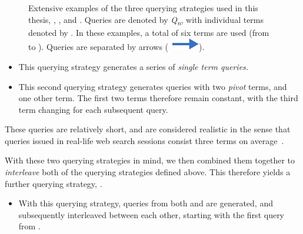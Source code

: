 \begin{figure}[t!]
    \centering
    \caption[Querying strategies ,  and ]{Extensive examples of the three querying strategies used in this thesis, , , and . Queries are denoted by \emph{Q\textsubscript{n}}, with individual terms denoted by . In these examples, a total of six terms are used (from  to ). Queries are separated by arrows (~\includegraphics[height=\fontcharht\font`\d]{figures/src/arrow-blue-right.pdf}).}
    \label{fig:querying}
\end{figure}

\begin{itemize}
    \item{ This querying strategy generates a series of \emph{single term queries.}}
    \item{ This second querying strategy generates queries with two \emph{pivot} terms, and one other term. The first two terms therefore remain constant, with the third term changing for each subsequent query.}
\end{itemize}

These queries are relatively short, and are considered realistic in the sense that queries issued in real-life web search sessions consist three terms on average~\citep{keskustalo2009querying}.

With these two querying strategies in mind, we then combined them together to \emph{interleave} both of the querying strategies defined above. This therefore yields a further querying strategy, .

\begin{itemize}
    \item{ With this querying strategy, queries from both  and  are generated, and subsequently interleaved between each other, starting with the first query from .}
\end{itemize}

